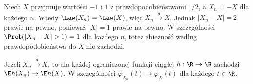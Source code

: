 \begin{przyklad}
Niech $X$ przyjmuje wartości $-1$ i $1$ z
prawdopodobieństwami $1/2$, a $X_n=-X$ dla każdego $n$.
Wtedy $\Law(X_n)=\Law(X)$, więc $X_n\xrightarrow{d}X$.
Jednak $|X_n-X|=2$ prawie na pewno, ponieważ
$|X|=1$ prawie na pewno. W szczególności
$\Prob(|X_n-X|>1)=1$ dla każdego $n$, toteż
zbieżność według prawdopodobieństwa do $X$ nie zachodzi.
\end{przyklad}

\begin{lemat}
Jeżeli $X_n\xrightarrow{d}X$, to dla każdej ograniczonej
funkcji ciągłej $h:\R\to\R$ zachodzi
$\E h(X_n)\to\E h(X)$.
W szczególności $\varphi_{X_n}(t)\to\varphi_X(t)$
dla każdego $t\in\R$.
\end{lemat}
